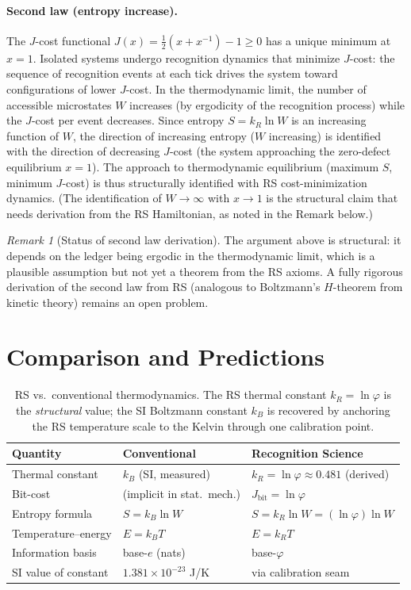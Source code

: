 \documentclass[12pt,a4paper]{article}
\theoremstyle{definition}
\theoremstyle{remark}
\newtheorem{remark}[theorem]{Remark}
\begin{document}
\paragraph{Second law (entropy increase).}
The $J$-cost functional $J(x) = \frac{1}{2}(x + x^{-1}) - 1 \geq 0$
has a unique minimum at $x = 1$.  Isolated systems undergo recognition
dynamics that minimize $J$-cost: the sequence of recognition events at
each tick drives the system toward configurations of lower $J$-cost.
In the thermodynamic limit, the number of accessible microstates
$W$ increases (by ergodicity of the recognition process) while the
$J$-cost per event decreases.  Since entropy $S = k_R \ln W$ is an
increasing function of $W$, the direction of increasing entropy ($W$
increasing) is identified with the direction of decreasing $J$-cost
(the system approaching the zero-defect equilibrium $x = 1$).
The approach to thermodynamic equilibrium (maximum $S$, minimum
$J$-cost) is thus structurally identified with RS cost-minimization
dynamics.  (The identification of $W \to \infty$ with $x \to 1$ is
the structural claim that needs derivation from the RS Hamiltonian,
as noted in the Remark below.)

\begin{remark}[Status of second law derivation]
The argument above is structural: it depends on the ledger being
ergodic in the thermodynamic limit, which is a plausible assumption
but not yet a theorem from the RS axioms.  A fully rigorous derivation
of the second law from RS (analogous to Boltzmann's $H$-theorem from
kinetic theory) remains an open problem.
\end{remark}

\section{Comparison and Predictions}

\begin{table}[h]
\centering
\begin{tabular}{@{}lll@{}}
\toprule
Quantity & Conventional & Recognition Science \\
\midrule
Thermal constant & $k_B$ (SI, measured) & $k_R = \ln\varphi \approx 0.481$ (derived) \\
Bit-cost & (implicit in stat.\ mech.) & $J_{\mathrm{bit}} = \ln\varphi$ \\
Entropy formula & $S = k_B \ln W$ & $S = k_R \ln W = (\ln\varphi)\ln W$ \\
Temperature--energy & $E = k_B T$ & $E = k_R T$ \\
Information basis & base-$e$ (nats) & base-$\varphi$ \\
SI value of constant & $1.381 \times 10^{-23}$ J/K & via calibration seam \\
\bottomrule
\end{tabular}
\caption{RS vs.\ conventional thermodynamics.  The RS thermal
constant $k_R = \ln\varphi$ is the \emph{structural} value;
the SI Boltzmann constant $k_B$ is recovered by anchoring the
RS temperature scale to the Kelvin through one calibration point.}
\end{table}
\end{document}
